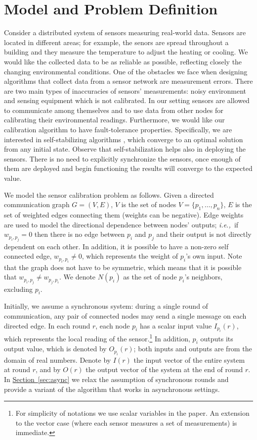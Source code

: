 \documentclass[preprint,12pt]{elsarticle}
\newcommand{\ie}{\emph{i.e.,\ }}
\newcommand{\namedref}[2]{\hyperref[#2]{#1~\ref*{#2}}}
\newcommand{\sectionref}[1]{\namedref{Section}{#1}}
\newcommand\N{N}\newcommand\fl{f_{\!\ell}}
\newcommand{\Ir}[1]{I(#1)}
\newcommand{\Or}[1]{O(#1)}
\newcommand{\II}[2]{I_{#1}(#2)}
\newcommand{\OO}[2]{O_{#1}(#2)}
\begin{document}
\section{Model and Problem Definition}\label{sec:model}
Consider a distributed system of sensors measuring real-world
data. Sensors are located in different areas; for example, the
senors are spread throughout a building and they measure the
temperature to adjust the heating or cooling. We would like the
collected data to be as reliable as possible, reflecting closely the changing
environmental conditions. One of the obstacles we face when designing
algorithms that collect data from a sensor network are measurement errors.
There are two main types of inaccuracies of sensors' measurements: noisy environment
and sensing equipment which is not calibrated.
In our setting sensors are allowed to
communicate among themselves
and
to use data from other nodes for
calibrating their
environmental readings.
Furthermore, we would like our
calibration algorithm to have fault-tolerance properties.
Specifically, we are interested in self-stabilizing algorithms
\cite{DolevSSBook}, which converge to an optimal solution from
any initial state. Observe that self-stabilization helps also in deploying the sensors.
There is no need to explicitly synchronize the sensors, once enough of them
are deployed and begin functioning the results will converge to the expected value.

We model the sensor calibration problem as follows. Given a directed
communication graph $G =(V,E)$, $V$ is the set of nodes $V =
\{p_1, \dots, p_n\}$, $E$ is the set of weighted edges connecting
them (weights can be negative). Edge weights are used to model the directional dependence between nodes' outputs; \ie if $w_{p_i,p_j}=0$ then there is no edge between $p_i$ and $p_j$ and their output is not directly dependent on each other. In addition, it is possible to have a non-zero self
connected edge, $w_{p_i,p_i} \neq 0$, which represents the weight of $p_i$'s own input. Note that the graph
does not have to be symmetric, which means that it is possible that $w_{p_i,p_j} \ne w_{p_j,p_i}$.
We denote $\N(p_i)$ as the set of node $p_i$'s neighbors, excluding $p_i$. 

Initially, we assume a synchronous system: during a single round of communication, any pair of connected
nodes may send a single message on each directed edge. In each round
$r$, each node $p_i$ has a scalar input value $\II{p_i}{r}$, which
represents the local reading of the sensor.\footnote{For simplicity
of notations we use scalar variables in the paper. An extension to
the vector case (where each sensor measures a set of measurements) is immediate.} In addition, $p_i$ outputs its
output value, which is denoted by $\OO{p_i}{r}$; both inputs and outputs are from the domain of real numbers. Denote by $\Ir{r}$ the
input vector of the entire system at round $r$, and by $\Or{r}$
the output vector of the system at the end of round $r$.
In \sectionref{sec:async} we relax the assumption of synchronous rounds
and provide a variant of the algorithm that works in asynchronous settings.
\end{document}
